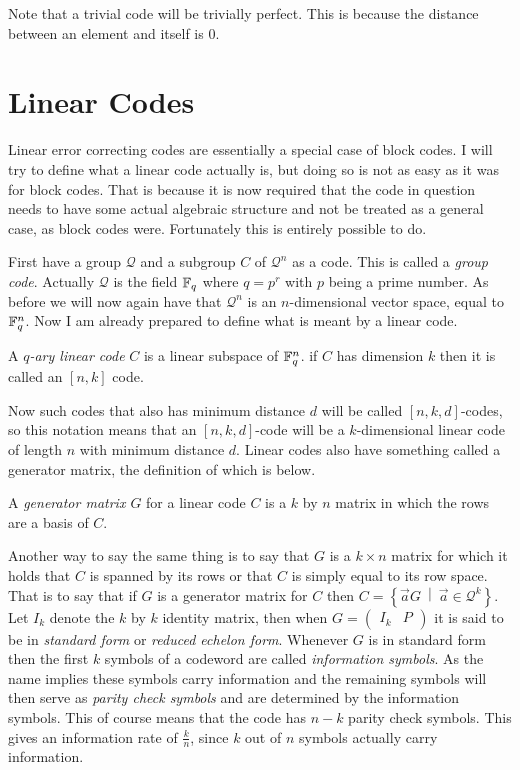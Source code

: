 Note that a trivial code will be trivially perfect. This is because the distance between an element and itself is $0$.



\section{Linear Codes}
\label{sec:lc}

Linear error correcting codes are essentially a special case of block codes. I will try to define what a linear code actually is, but doing so is not as easy as it was for block codes. That is because it is now required that the code in question needs to have some actual algebraic structure and not be treated as a general case, as block codes were. Fortunately this is entirely possible to do.

First have a group $\mathcal{Q}$ and a subgroup $C$ of $\mathcal{Q}^n$ as a code. This is called a \emph{group code}. Actually $\mathcal{Q}$ is the field $\mathbb{F}_{q}$ where $q = p^r$ with $p$ being a prime number. As before we will now again have that $\mathcal{Q}^n$ is an $n$-dimensional vector space, equal to $\mathbb{F}^{n}_{q}$. Now I am already prepared to define what is meant by a linear code.
\begin{defi}
\label{def:linCode}
	A \emph{$q$-ary linear code} $C$ is a linear subspace of $\mathbb{F}_{q}^{n}$. if $C$ has dimension $k$ then it is called an $\left[n,k\right]$ code.
\end{defi}
Now such codes that also has minimum distance $d$ will be called $\left[n,k,d\right]$-codes, so this notation means that an $\left[n,k,d\right]$-code will be a $k$-dimensional linear code of length $n$ with minimum distance $d$. Linear codes also have something called a generator matrix, the definition of which is below.
\begin{defi}
\label{def:genMatLinCode}
	A \emph{generator matrix $G$} for a linear code $C$ is a $k$ by $n$ matrix in which the rows are a basis of $C$.
\end{defi}
Another way to say the same thing is to say that $G$ is a $k \times n$ matrix for which it holds that $C$ is spanned by its rows or that $C$ is simply equal to its row space. That is to say that if $G$ is a generator matrix for $C$ then $C = \left\{ \vec{a}G \ \middle\vert \ \vec{a} \in \mathcal{Q}^k \right\}$. Let $I_k$ denote the $k$ by $k$ identity matrix, then when $G = \begin{pmatrix}
I_k & P
\end{pmatrix}$ it is said to be in \emph{standard form} or \emph{reduced echelon form}. Whenever $G$ is in standard form then the first $k$ symbols of a codeword are called \emph{information symbols}. As the name implies these symbols carry information and the remaining symbols will then serve as \emph{parity check symbols} and are determined by the information symbols. This of course means that the code has $n-k$ parity check symbols. This gives an information rate of $\frac{k}{n}$, since $k$ out of $n$ symbols actually carry information.

